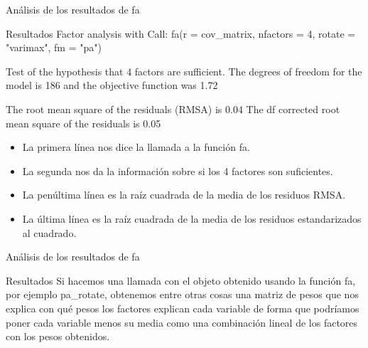 \documentclass[10pt]{beamer}
\begin{document}
\begin{frame}[fragile]{Análisis de los resultados de fa}
	\begin{alertblock}{Resultados}
		Factor analysis with Call: fa(r = cov\_matrix, nfactors = 4, rotate = "varimax", fm = "pa")
		
		Test of the hypothesis that 4 factors are sufficient.
		The degrees of freedom for the model is 186  and the objective function was  1.72 
		
		The root mean square of the residuals (RMSA) is  0.04 
		The df corrected root mean square of the residuals is  0.05 
		
		\begin{itemize}
			\item La primera línea nos dice la llamada a la función fa.
			\item La segunda nos da la información sobre si los 4 factores son suficientes.
			\item La penúltima línea es la raíz cuadrada de la media de los residuos RMSA.
			\item La última línea es la raíz cuadrada de la media de los residuos estandarizados al cuadrado.
		\end{itemize}
	\end{alertblock}
\end{frame}

\begin{frame}[fragile]{Análisis de los resultados de fa}
\begin{alertblock}{Resultados}
	Si hacemos una llamada con el objeto obtenido usando la función fa, por ejemplo pa\_rotate, obtenemos entre otras cosas una matriz de pesos que nos explica con qué pesos los factores explican cada variable de forma que podríamos poner cada variable menos su media como una combinación lineal de los factores con los pesos obtenidos.
\end{alertblock}
\end{frame}
\end{document}
